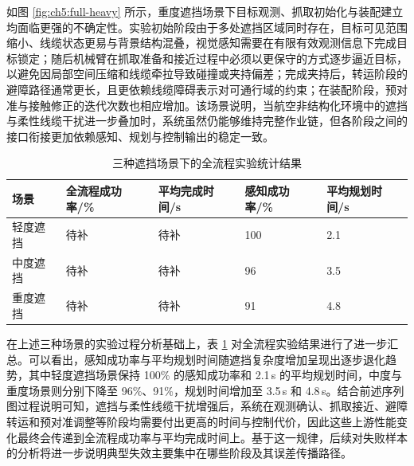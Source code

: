 如图 \ref{fig:ch5:full-heavy} 所示，重度遮挡场景下目标观测、抓取初始化与装配建立均面临更强的不确定性。实验初始阶段由于多处遮挡区域同时存在，目标可见范围缩小、线缆状态更易与背景结构混叠，视觉感知需要在有限有效观测信息下完成目标锁定；随后机械臂在抓取准备和接近过程中必须以更保守的方式逐步逼近目标，以避免因局部空间压缩和线缆牵拉导致碰撞或夹持偏差；完成夹持后，转运阶段的避障路径通常更长，且更依赖线缆障碍表示对可通行域的约束；在装配阶段，预对准与接触修正的迭代次数也相应增加。该场景说明，当航空非结构化环境中的遮挡与柔性线缆干扰进一步叠加时，系统虽然仍能够维持完整作业链，但各阶段之间的接口衔接更加依赖感知、规划与控制输出的稳定一致。

\begin{table}[htbp]
  \centering
  \caption{三种遮挡场景下的全流程实验统计结果}
  \label{tab:ch5:fullstat}
  \begin{tabular}{|p{2.2cm}|p{2.5cm}|p{2.8cm}|p{2.4cm}|p{2.6cm}|}
    \hline
    场景 & 全流程成功率/\% & 平均完成时间/s & 感知成功率/\% & 平均规划时间/s \\
    \hline
    轻度遮挡 & 待补 & 待补 & 100 & 2.1 \\
    \hline
    中度遮挡 & 待补 & 待补 & 96 & 3.5 \\
    \hline
    重度遮挡 & 待补 & 待补 & 91 & 4.8 \\
    \hline
  \end{tabular}
\end{table}

在上述三种场景的实验过程分析基础上，表 \ref{tab:ch5:fullstat} 对全流程实验结果进行了进一步汇总。可以看出，感知成功率与平均规划时间随遮挡复杂度增加呈现出逐步退化趋势，其中轻度遮挡场景保持 100\% 的感知成功率和 2.1\,s 的平均规划时间，中度与重度场景则分别下降至 96\%、91\%，规划时间增加至 3.5\,s 和 4.8\,s。结合前述序列图过程说明可知，遮挡与柔性线缆干扰增强后，系统在观测确认、抓取接近、避障转运和预对准调整等阶段均需要付出更高的时间与控制代价，因此这些上游性能变化最终会传递到全流程成功率与平均完成时间上。基于这一规律，后续对失败样本的分析将进一步说明典型失效主要集中在哪些阶段及其误差传播路径。

